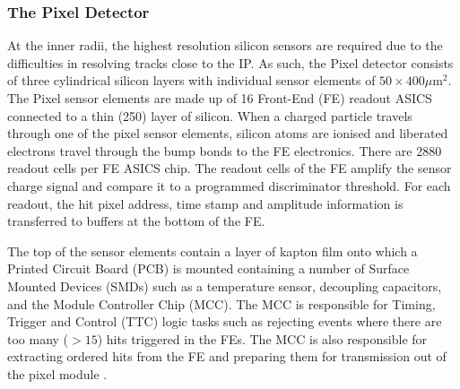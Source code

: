 \subsubsection{The Pixel Detector}
At the inner radii, the highest resolution silicon sensors are required due to the difficulties in resolving tracks close to the IP. As such, the Pixel detector consists of three cylindrical silicon layers with individual sensor elements of $50\times400\mu\mathrm{m}^2$. The Pixel sensor elements are made up of 16 Front-End (FE) readout ASICS connected to a thin (250\microns) layer of silicon. When a charged particle travels through one of the pixel sensor elements, silicon atoms are ionised and liberated electrons travel through the bump bonds to the FE electronics. There are 2880 readout cells per FE ASICS chip. The readout cells of the FE amplify the sensor charge signal and compare it to a programmed discriminator threshold. For each readout, the hit pixel address, time stamp and amplitude information is transferred to buffers at the bottom of the FE.%

The top of the sensor elements contain a layer of kapton film onto which a Printed Circuit Board (PCB) is mounted containing a number of Surface Mounted Devices (SMDs) such as a temperature sensor, decoupling capacitors, and the Module Controller Chip (MCC). The MCC is responsible for Timing, Trigger and Control (TTC) logic tasks such as rejecting events where there are too many ($>15$) hits triggered in the FEs. The MCC is also responsible for extracting ordered hits from the FE and preparing them for transmission out of the pixel module \cite{Atlas:MCCmodule}.%
